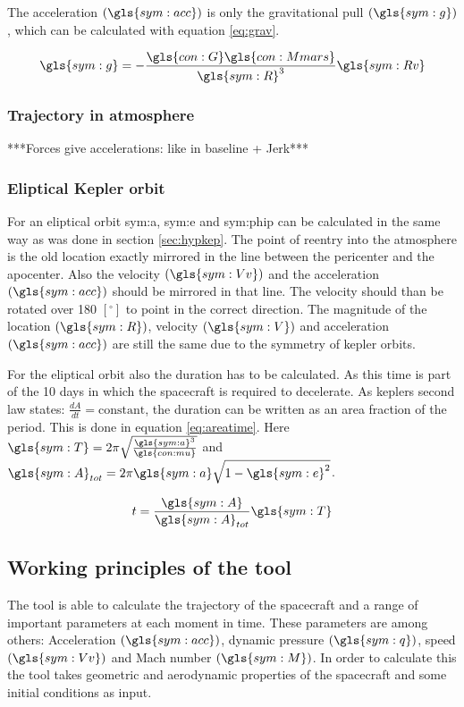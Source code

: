 The acceleration $\left(\gls{sym:acc}\right)$ is only the gravitational pull $\left(\gls{sym:g}\right)$, which can be calculated with equation \ref{eq:grav}.

\begin{equation} \label{eq:grav}
\gls{sym:g} = -\frac{\gls{con:G}\gls{con:Mmars}}
					{\gls{sym:R}^3}\gls{sym:Rv}
\end{equation}

\subsubsection{Trajectory in atmosphere}
 \label{sec:trajatmos}
***Forces give accelerations: like in baseline + Jerk***\\

\subsubsection{Eliptical Kepler orbit}
 \label{sec:eliptickep}
For an eliptical orbit \gls{sym:a}, \gls{sym:e} and \gls{sym:phip} can be calculated in the same way as was done in section \ref{sec:hypkep}. The point of reentry into the atmosphere is the old location exactly mirrored in the line between the pericenter and the apocenter. Also the velocity $\left(\gls{sym:Vv}\right)$ and the acceleration $\left(\gls{sym:acc}\right)$  should be mirrored in that line. The velocity should than be rotated over 180 $\left[^\circ\right]$ to point in the correct direction. The magnitude of the location $\left(\gls{sym:R}\right)$, velocity $\left(\gls{sym:V}\right)$ and acceleration $\left(\gls{sym:acc}\right)$ are still the same due to the symmetry of kepler orbits.

For the eliptical orbit also the duration has to be calculated. As this time is part of the 10 days in which the spacecraft is required to decelerate. As keplers second law states: $\frac{dA}{dt}=\mbox{constant}$, the duration can be written as an area fraction of the period. This is done in equation \ref{eq:areatime}. Here $\gls{sym:T} = 2\pi\sqrt{\frac{\gls{sym:a}^3}{\gls{con:mu}}}$ and $\gls{sym:A}_{tot} = 2\pi \gls{sym:a} \sqrt{1-\gls{sym:e}^2}$.

\begin{equation}
t = \frac{\gls{sym:A}}{\gls{sym:A}_{tot}}\gls{sym:T}
\label{eq:areatime}
\end{equation}

\subsection{Working principles of the tool}
\label{sec:astrowp}
The tool is able to calculate the trajectory of the spacecraft and a range of important parameters at each moment in time. These parameters are among others: Acceleration $\left(\gls{sym:acc}\right)$, dynamic pressure $\left(\gls{sym:q}\right)$, speed $\left(\gls{sym:Vv}\right)$ and Mach number $\left(\gls{sym:M}\right)$. In order to calculate this the tool takes geometric and aerodynamic properties of the spacecraft and some initial conditions as input.

